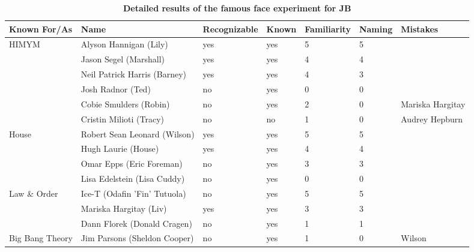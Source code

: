 \documentclass[fleqn,10pt]{SelfArx} %
\begin{document}
\begin{table}[htbp]
	
	\renewcommand{\familydefault}{\sfdefault}\normalfont\renewcommand{}
	\centering
	\small
	\caption{\bf Detailed results of the famous face experiment for JB}
	
	\begin{tabular}{lllllll}
				\hline
		Known For/As    & Name                         & Recognizable & Known & Familiarity & Naming & Mistakes         \\
				\hline
		HIMYM           & Alyson Hannigan (Lily)       & yes     & yes   & 5               & 5            &                  \\
		& Jason Segel (Marshall)       & yes     & yes   & 4               & 4            &                  \\
		& Neil Patrick Harris (Barney) & yes     & yes   & 4               & 3            &                  \\
		& Josh Radnor (Ted)            & no      & yes   & 0               & 0            &                  \\
		& Cobie Smulders (Robin)       & no      & yes   & 2               & 0            & Mariska Hargitay \\
		& Cristin Milioti (Tracy)      & no      & no    & 1               & 0            & Audrey Hepburn   \\
		House           & Robert Sean Leonard (Wilson) & yes     & yes   & 5               & 5            &                  \\
		& Hugh Laurie (House)          & yes     & yes   & 4               & 4            &                  \\
		& Omar Epps (Eric Foreman)     & no      & yes   & 3               & 3            &                  \\
		& Lisa Edelstein (Lisa Cuddy)  & no      & yes   & 0               & 0            &                  \\
		Law \& Order    & Ice-T (Odafin 'Fin' Tutuola) & no      & yes   & 5               & 5            &                  \\
		& Mariska Hargitay (Liv)       & yes     & yes   & 3               & 3            &                  \\
		& Dann Florek (Donald Cragen)  & no      & yes   & 1               & 1            &                  \\
		Big Bang Theory & Jim Parsons (Sheldon Cooper) & no      & yes   & 1               & 0            & Wilson           \\

\end{tabular}
\end{table}
\end{document}
